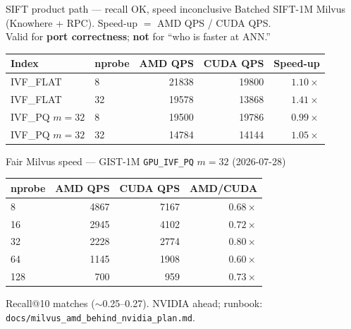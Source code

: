 \documentclass[aspectratio=169,11pt]{beamer}
\begin{document}
\begin{frame}{SIFT product path --- recall OK, speed inconclusive}
  \footnotesize
  Batched SIFT-1M Milvus (Knowhere + RPC). Speed-up $=$ AMD QPS / CUDA QPS.\\
  Valid for \textbf{port correctness}; \textbf{not} for ``who is faster at ANN.''\\[0.35em]

  \begin{center}
  \begin{tabular}{@{}llrrr@{}}
    \toprule
    \textbf{Index} & \textbf{nprobe}
      & \textbf{{\color{red}AMD} QPS} & \textbf{{\color{green!60!black}CUDA} QPS} & \textbf{Speed-up} \\
    \midrule
    IVF\_FLAT & 8  & 21838 & 19800 & $1.10\times$ \\
    IVF\_FLAT & 32 & 19578 & 13868 & $1.41\times$ \\
    IVF\_PQ $m{=}32$ & 8  & 19500 & 19786 & $0.99\times$ \\
    IVF\_PQ $m{=}32$ & 32 & 14784 & 14144 & $1.05\times$ \\
    \bottomrule
  \end{tabular}
  \end{center}

  \vspace{0.5em}
  \begin{block}{Fair Milvus speed --- GIST-1M \texttt{GPU\_IVF\_PQ} $m{=}32$ (2026-07-28)}
    \footnotesize
    \begin{center}
    \begin{tabular}{@{}lrrr@{}}
      \toprule
      \textbf{nprobe}
        & \textbf{{\color{red}AMD} QPS}
        & \textbf{{\color{green!60!black}CUDA} QPS}
        & \textbf{AMD/CUDA} \\
      \midrule
      8   & 4867 & 7167 & $0.68\times$ \\
      16  & 2945 & 4102 & $0.72\times$ \\
      32  & 2228 & 2774 & $0.80\times$ \\
      64  & 1145 & 1908 & $0.60\times$ \\
      128 & 700  & 959  & $0.73\times$ \\
      \bottomrule
    \end{tabular}
    \end{center}
    Recall@10 matches ($\sim$0.25--0.27). NVIDIA ahead;
    runbook: \texttt{docs/milvus\_amd\_behind\_nvidia\_plan.md}.
  \end{block}
\end{frame}
\end{document}
